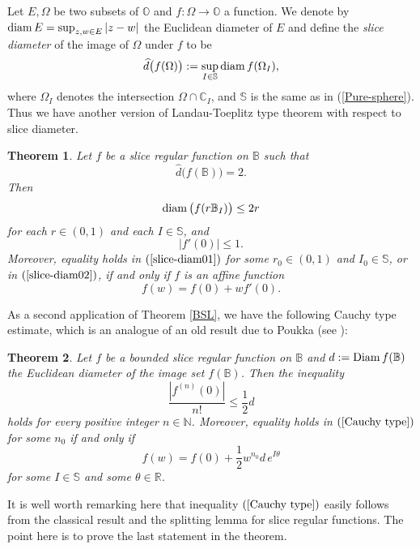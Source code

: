 \documentclass{amsart}
\newtheorem{theorem}{Theorem}[section]
\theoremstyle{definition}
\theoremstyle{remark}
\numberwithin{equation}{section}
\begin{document}
Let $E, \Omega$ be two subsets of $\mathbb O$ and $f: \Omega\rightarrow \mathbb O$ a function. We denote by ${\rm{diam}}\, E=\sup_{z, w\in E}|z-w|$ the Euclidean diameter of $E$ and define the \textit{slice diameter} of the image of $\Omega$ under $f$ to be
\begin{equation}\label{slice-diam}
\widehat{d}\big(f(\Omega)\big):=\sup_{I\in\mathbb S}{\rm{diam}}\, f(\Omega_I),
\end{equation}
where $\Omega_I$ denotes the intersection $\Omega\cap\mathbb C_I$, and $\mathbb S$ is the same as in (\ref{Pure-sphere}).
Thus we have another version of Landau-Toeplitz type theorem with respect to slice diameter.
\begin{theorem}\label{slice diam-LT}
Let $f$ be a slice  regular function on $\mathbb B$ such that
$$\widehat{d}\big(f(\mathbb B)\big)=2.$$
Then
\begin{equation}\label{slice-diam01}
{\rm{diam}}\,\big(f(r\mathbb B_I)\big)\leq 2r
\end{equation}
for each $r\in(0, 1)$ and each $I\in\mathbb S$, and
\begin{equation}\label{slice-diam02}
 |f'(0)|\leq 1.
\end{equation}
Moreover, equality holds in $(\ref{slice-diam01})$ for some $r_0\in(0,1)$ and $I_0\in\mathbb S$, or in $(\ref{slice-diam02})$, if and only if $f$ is an affine function
$$f(w)=f(0)+wf'(0).$$
\end{theorem}

As a second application of Theorem \ref{BSL}, we have the following Cauchy type estimate, which is an analogue of an old result due to Poukka (see \cite{Poukka}):

\begin{theorem}\label{Poukka}
Let $f$ be a bounded  slice regular function on $\mathbb B$ and $d:={\rm{Diam}}\, f(\mathbb B)$ the Euclidean diameter of the image set $f(\mathbb B)$. Then the inequality
\begin{equation}\label{Cauchy type}
\frac{|f^{(n)}(0)|}{n!}\leq \frac12d
\end{equation}
holds for every positive  integer $n\in \mathbb N$. Moreover, equality holds in $(\ref{Cauchy type})$ for some $n_0$ if and only if
$$f(w)=f(0)+\frac12 w^{n_0}d\,e^{I\theta}$$
for some $I\in\mathbb S$ and some $\theta \in \mathbb R$.
\end{theorem}
It is well worth remarking here that inequality $(\ref{Cauchy type})$ easily follows from the classical result and the splitting lemma for slice regular functions. The point here is to prove the last statement in the theorem.
\end{document}
